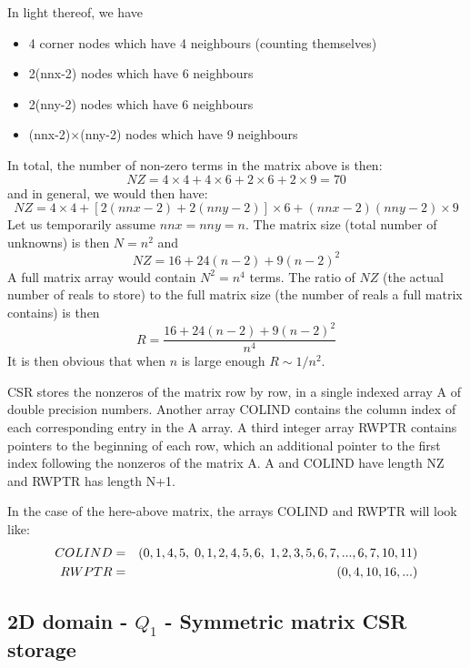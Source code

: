 In light thereof, we have
\begin{itemize}
\item 4 corner nodes which have 4 neighbours (counting themselves) 
\item 2(nnx-2) nodes which have 6 neighbours
\item 2(nny-2) nodes which have 6 neighbours
\item (nnx-2)$\times$(nny-2) nodes which have 9 neighbours
\end{itemize}
In total, the number of non-zero terms in the matrix above is then:
\[
NZ=4\times4+4\times6+2\times6+2\times9=70
\]
and in general, we would then have:
\[
NZ=4\times4+[2(nnx-2)+2(nny-2)]\times6 + (nnx-2)(nny-2)\times9
\]
Let us temporarily assume $nnx=nny=n$. The matrix size (total
number of unknowns) is then $N=n^2$ and  
\[
NZ=16+24(n-2)+9(n-2)^2
\]
A full matrix array would contain $N^2=n^4$ terms. 
The ratio of $NZ$ (the actual number of reals to store)
to the full matrix size (the number of reals a full matrix contains) is then 
\[
R = \frac{16+24(n-2)+9(n-2)^2}{n^4}
\]
It is then obvious that when $n$ is large enough $R \sim 1/n^2$.

CSR stores the nonzeros of the matrix row by row, in a
single indexed array A of double precision  numbers.
Another array COLIND contains the column index of each
corresponding entry in the A array. A third integer array RWPTR
contains pointers to the beginning of each row, which an additional pointer to
the first index following the nonzeros of the matrix A.
A and COLIND have length NZ and RWPTR has length N+1.

In the case of the here-above matrix, the arrays COLIND and RWPTR will look like:
\begin{eqnarray}
COLIND&=&(0,1,4,5, \; 0,1,2,4,5,6, \; 1,2,3,5,6,7, ..., 6,7,10,11) \nonumber\\
RWPTR &=&(0,4,10,16, ... )   \nonumber
\end{eqnarray}


\subsection{2D domain - $Q_1$ - Symmetric matrix CSR storage} \label{ss:symmcsrss}

